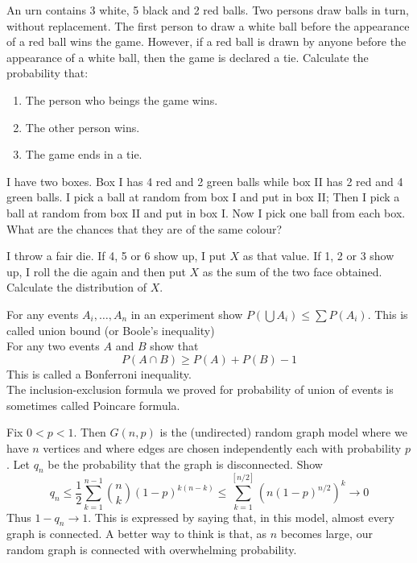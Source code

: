 \documentclass[12pt]{article}
\newenvironment{question}[2][Question]{\begin{trivlist}
\item[\hskip \labelsep {\bfseries #1}\hskip \labelsep {\bfseries #2.}]}{\end{trivlist}}
\begin{document}
\begin{question}{11}
An urn contains 3 white, 5 black and 2 red balls. Two persons draw balls in turn, without replacement. The first person to draw a white ball before the appearance of a red ball wins the game. However, if a red ball is drawn by anyone before the appearance of a white ball, then the game is declared a tie. Calculate the probability that:
\begin{enumerate}
\item The person who beings the game wins.
\item The other person wins.
\item The game ends in a tie.
\end{enumerate}
\end{question}

\begin{question}{12}
I have two boxes. Box I has 4 red and 2 green balls while box II has 2 red and 4 green balls. I pick a ball at random from box I and put in box II; Then I pick a ball at random from box II and put in box I. Now I pick one ball from each box. What are the chances that they are of the same colour?
\end{question}

\begin{question}{13}
I throw a fair die. If 4, 5 or 6 show up, I put $X$ as that value. If 1, 2 or 3 show up, I roll the die again and then put $X$ as the sum of the two face obtained. Calculate the distribution of $X$.
\end{question}

\begin{question}{14}
For any events $A_i,\ldots,A_n$ in an experiment show $P(\bigcup A_i) \leq \sum{P(A_i)}$. This is called union bound (or Boole's inequality)\\ For any two events $A$ and $B$ show that $$P(A\cap B) \geq P(A) + P(B) - 1$$
This is called a Bonferroni inequality.\\
The inclusion-exclusion formula we proved for probability of union of events is sometimes called Poincare formula.
\end{question}

\begin{question}{15}
Fix $0 < p < 1$. Then $G(n,p)$ is the (undirected) random graph model where we have $n$ vertices and where edges are chosen independently each with probability $p$. Let $q_n$ be the probability that the graph is disconnected. Show $$q_n \leq \frac{1}{2} \sum_{k=1}^{n-1}{n \choose k}(1-p)^{k(n-k)} \leq \sum_{k=1}^{[n/2]}{(n(1-p)^{n/2})^k} \to 0$$
Thus $1-q_n \to 1$. This is expressed by saying that, in this model, almost every graph is connected. A better way to think is that, as $n$ becomes large, our random graph is connected with overwhelming probability.
\end{question}
\end{document}
